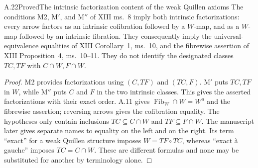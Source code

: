 \begin{claim}{A.22}{Proved}{The intrinsic factorization content of the weak Quillen axioms}
The conditions M2, M$'$, and M$''$ of XIII ms.~8 imply both intrinsic factorizations: every arrow factors as an intrinsic cofibration followed by a $W$-map, and as a $W$-map followed by an intrinsic fibration. They consequently imply the universal-equivalence equalities of XIII Corollary~1, ms.~10, and the fibrewise assertion of XIII Proposition~4, ms.~10--11. They do not identify the designated classes $TC,TF$ with $C\cap W,F\cap W$.
\end{claim}
\begin{proof}
M2 provides factorizations using $(C,TF)$ and $(TC,F)$. M$'$ puts $TC,TF$ in $W$, while M$''$ puts $C$ and $F$ in the two intrinsic classes. This gives the asserted factorizations with their exact order. A.11 gives $\operatorname{Fib}_W\cap W=W^u$ and the fibrewise assertion; reversing arrows gives the cofibration equality. The hypotheses only contain inclusions $TC\subseteq C\cap W$ and $TF\subseteq F\cap W$. The manuscript later gives separate names to equality on the left and on the right. Its term ``exact'' for a weak Quillen structure imposes $W=TF\circ TC$, whereas ``exact \`a gauche'' imposes $TC=C\cap W$. These are different formulas and none may be substituted for another by terminology alone.
\end{proof}

